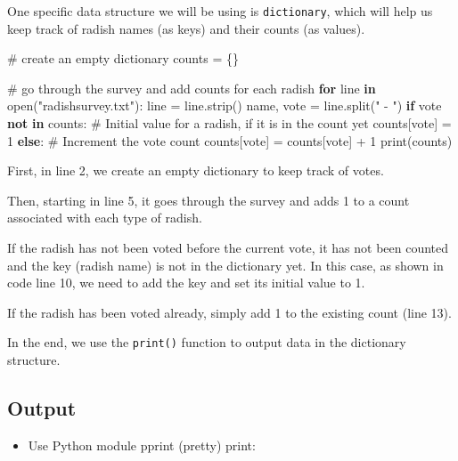 \documentclass[
  letterpaper,
]{scrbook}
\newenvironment{Shaded}{\begin{snugshade}}{\end{snugshade}}
\newcommand{\BuiltInTok}[1]{\textcolor[rgb]{0.00,0.23,0.31}{#1}}
\newcommand{\CommentTok}[1]{\textcolor[rgb]{0.37,0.37,0.37}{#1}}
\newcommand{\ControlFlowTok}[1]{\textcolor[rgb]{0.00,0.23,0.31}{\textbf{#1}}}
\newcommand{\DecValTok}[1]{\textcolor[rgb]{0.68,0.00,0.00}{#1}}
\newcommand{\KeywordTok}[1]{\textcolor[rgb]{0.00,0.23,0.31}{\textbf{#1}}}
\newcommand{\NormalTok}[1]{\textcolor[rgb]{0.00,0.23,0.31}{#1}}
\newcommand{\OperatorTok}[1]{\textcolor[rgb]{0.37,0.37,0.37}{#1}}
\newcommand{\StringTok}[1]{\textcolor[rgb]{0.13,0.47,0.30}{#1}}
\providecommand{\tightlist}{%
  \setlength{\itemsep}{0pt}\setlength{\parskip}{0pt}}
\begin{document}
One specific data structure we will be using is \texttt{dictionary},
which will help us keep track of radish names (as keys) and their counts
(as values).

\begin{Shaded}
\begin{Highlighting}[]
\CommentTok{\# create an empty dictionary}
\NormalTok{counts }\OperatorTok{=}\NormalTok{ \{\}}

\CommentTok{\# go through the survey and add counts for each radish}
\ControlFlowTok{for}\NormalTok{ line }\KeywordTok{in} \BuiltInTok{open}\NormalTok{(}\StringTok{"radishsurvey.txt"}\NormalTok{):}
\NormalTok{    line }\OperatorTok{=}\NormalTok{ line.strip()}
\NormalTok{    name, vote }\OperatorTok{=}\NormalTok{ line.split(}\StringTok{" {-} "}\NormalTok{)}
    \ControlFlowTok{if}\NormalTok{ vote }\KeywordTok{not} \KeywordTok{in}\NormalTok{ counts:}
        \CommentTok{\# Initial value for a radish, if it is in the count yet}
\NormalTok{        counts[vote] }\OperatorTok{=} \DecValTok{1}
    \ControlFlowTok{else}\NormalTok{:}
        \CommentTok{\# Increment the vote count}
\NormalTok{        counts[vote] }\OperatorTok{=}\NormalTok{ counts[vote] }\OperatorTok{+} \DecValTok{1}
\BuiltInTok{print}\NormalTok{(counts) }
\end{Highlighting}
\end{Shaded}

First, in line 2, we create an empty dictionary to keep track of votes.

Then, starting in line 5, it goes through the survey and adds 1 to a
count associated with each type of radish.

If the radish has not been voted before the current vote, it has not
been counted and the key (radish name) is not in the dictionary yet. In
this case, as shown in code line 10, we need to add the key and set its
initial value to 1.

If the radish has been voted already, simply add 1 to the existing count
(line 13).

In the end, we use the \texttt{print()} function to output data in the
dictionary structure.

\subsection*{Output}\label{output-1}

\begin{itemize}
\tightlist
\item
  Use Python module pprint (pretty) print:
\end{itemize}
\end{document}
